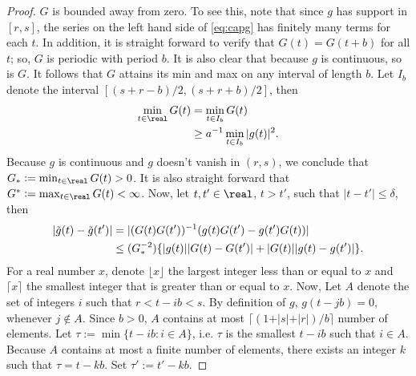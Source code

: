   \begin{proof}
   $G$ is bounded away from zero. To see this, note that since $g$ has support in  $[r,s]$, the series on the left hand side of \eqref{eq:capg} has finitely many terms for each $t$.  In addition, it is straight forward to verify that $G(t) = G(t+b)$ for all $t$; so,  $G$ is periodic with period $b$. It is also clear that because $g$ is continuous, so is $G$. It follows that $G$ attains its min and max on any interval of length $b$. Let $I_b$ denote the interval $[(s+r -b)/2, (s+r +b)/2]$, then
  \begin{align}
    \min_{t\in\real} G(t) &=  \min_{t \in I_b} G(t) \notag\\
    & \ge  a^{-1}\min_{t \in I_b}\vert g(t)\vert^2.\notag
    \label{}
  \end{align}  
  Because $g$ is continuous and $g$ doesn't vanish in $(r,s)$, we conclude that $G_*:=\min_{t \in \real}G(t) > 0$. It is also straight forward that $G^* := \max_{t \in \real}G(t) < \infty$. Now, let $t, t' \in \real$, $ t > t'$,  such that $\vert t - t' \vert \le \delta$, then 
  \begin{align}
     \vert \tilde{g}(t) - \tilde{g}(t')\vert & = \vert (G(t)G(t'))^{-1}(g(t)G(t') - g(t')G(t))\vert  \notag\\
    & \le (G_*^{-2})\{\vert g(t)\vert \vert G(t) - G(t') \vert + \vert G(t)\vert \vert g(t) - g(t')\vert\}. 
    \label{eq:difftg}
  \end{align}
For a real number  $x$, denote $\lfloor x \rfloor$  the largest integer less than or equal to $x$ and $\lceil x \rceil$  the smallest integer that is greater  than or equal to $x$. Now,
Let $A$ denote the set of integers $i$ such that $r < t - ib < s$. By definition of $g$, $g(t - j b) = 0$, whenever $j \not\in A$. Since $b > 0$, $A$ contains at most $\lceil( 1 + \vert s \vert + \vert r \vert)/b \rceil$ number of elements.  Let $\tau := \min \{t - ib: i \in A\}$, i.e. $\tau$ is the smallest $t - ib$ such that $i \in A$. Because $A$ contains at most a finite number of elements, there exists an integer $k$ such that $\tau = t - kb$. Set $\tau' := t'-kb$.   
  

\end{proof}
